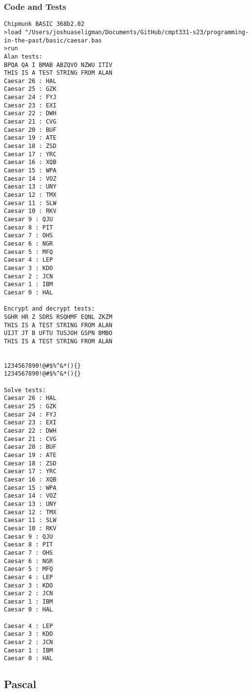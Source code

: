 \documentclass[letterpaper, 10pt, DIV=13]{scrartcl}
\numberwithin{equation}{section}
\numberwithin{figure}{section}
\numberwithin{table}{section}
\begin{document}
\subsubsection{Code and Tests}

\begin{lstlisting}[frame=single, caption = BASIC Output]
Chipmunk BASIC 368b2.02
>load "/Users/joshuaseligman/Documents/GitHub/cmpt331-s23/programming-in-the-past/basic/caesar.bas
>run
Alan tests:
BPQA QA I BMAB ABZQVO NZWU ITIV
THIS IS A TEST STRING FROM ALAN
Caesar 26 : HAL
Caesar 25 : GZK
Caesar 24 : FYJ
Caesar 23 : EXI
Caesar 22 : DWH
Caesar 21 : CVG
Caesar 20 : BUF
Caesar 19 : ATE
Caesar 18 : ZSD
Caesar 17 : YRC
Caesar 16 : XQB
Caesar 15 : WPA
Caesar 14 : VOZ
Caesar 13 : UNY
Caesar 12 : TMX
Caesar 11 : SLW
Caesar 10 : RKV
Caesar 9 : QJU
Caesar 8 : PIT
Caesar 7 : OHS
Caesar 6 : NGR
Caesar 5 : MFQ
Caesar 4 : LEP
Caesar 3 : KDO
Caesar 2 : JCN
Caesar 1 : IBM
Caesar 0 : HAL

Encrypt and decrypt tests:
SGHR HR Z SDRS RSQHMF EQNL ZKZM
THIS IS A TEST STRING FROM ALAN
UIJT JT B UFTU TUSJOH GSPN BMBO
THIS IS A TEST STRING FROM ALAN


1234567890!@#$%^&*(){}
1234567890!@#$%^&*(){}

Solve tests:
Caesar 26 : HAL
Caesar 25 : GZK
Caesar 24 : FYJ
Caesar 23 : EXI
Caesar 22 : DWH
Caesar 21 : CVG
Caesar 20 : BUF
Caesar 19 : ATE
Caesar 18 : ZSD
Caesar 17 : YRC
Caesar 16 : XQB
Caesar 15 : WPA
Caesar 14 : VOZ
Caesar 13 : UNY
Caesar 12 : TMX
Caesar 11 : SLW
Caesar 10 : RKV
Caesar 9 : QJU
Caesar 8 : PIT
Caesar 7 : OHS
Caesar 6 : NGR
Caesar 5 : MFQ
Caesar 4 : LEP
Caesar 3 : KDO
Caesar 2 : JCN
Caesar 1 : IBM
Caesar 0 : HAL

Caesar 4 : LEP
Caesar 3 : KDO
Caesar 2 : JCN
Caesar 1 : IBM
Caesar 0 : HAL
\end{lstlisting}

\subsection{Pascal}
\end{document}
